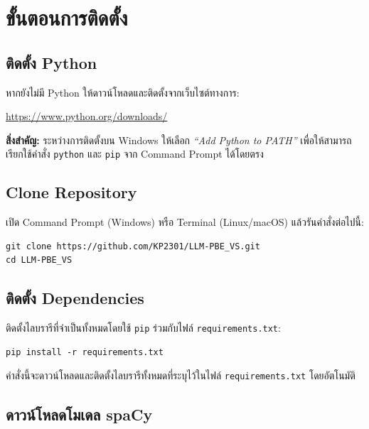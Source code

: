 \section{ขั้นตอนการติดตั้ง}
\label{sec:installation-steps}

\subsection{ติดตั้ง Python}
\label{subsec:install-python}

หากยังไม่มี Python ให้ดาวน์โหลดและติดตั้งจากเว็บไซต์ทางการ:

\begin{center}
\url{https://www.python.org/downloads/}
\end{center}

\noindent\textbf{สิ่งสำคัญ:} ระหว่างการติดตั้งบน Windows ให้เลือก \textit{``Add Python to PATH''} เพื่อให้สามารถเรียกใช้คำสั่ง \texttt{python} และ \texttt{pip} จาก Command Prompt ได้โดยตรง

\subsection{Clone Repository}
\label{subsec:clone-repo}

เปิด Command Prompt (Windows) หรือ Terminal (Linux/macOS) แล้วรันคำสั่งต่อไปนี้:

\begin{lstlisting}[style=bash]
git clone https://github.com/KP2301/LLM-PBE_VS.git
cd LLM-PBE_VS
\end{lstlisting}

\subsection{ติดตั้ง Dependencies}
\label{subsec:install-deps}

ติดตั้งไลบรารีที่จำเป็นทั้งหมดโดยใช้ \texttt{pip} ร่วมกับไฟล์ \texttt{requirements.txt}:

\begin{lstlisting}[style=bash]
pip install -r requirements.txt
\end{lstlisting}

\noindent คำสั่งนี้จะดาวน์โหลดและติดตั้งไลบรารีทั้งหมดที่ระบุไว้ในไฟล์ \texttt{requirements.txt} โดยอัตโนมัติ

\subsection{ดาวน์โหลดโมเดล spaCy}
\label{subsec:download-spacy}

